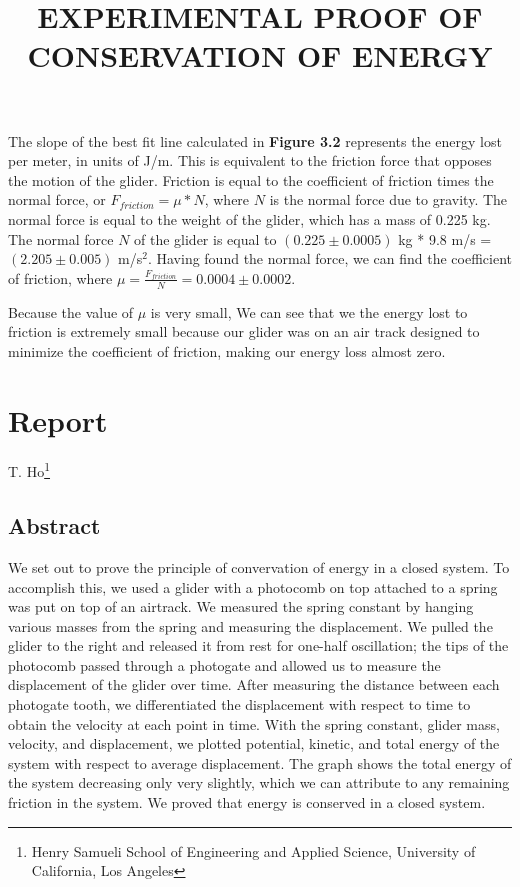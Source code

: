 \documentclass[11pt]{report}
\begin{document}
\newpage
\setlength{\parindent}{5ex}
The slope of the best fit line calculated in \textbf{Figure 3.2} represents the
energy lost per meter, in units of J/m.  This is equivalent to the friction
force that opposes the motion of the glider. Friction is equal to the
coefficient of friction times the normal force, or \(F_{friction} = \mu
* N\), where \(N\) is the normal force due to gravity.  The normal force is
equal to the weight of the glider, which has a mass of 0.225 kg.  The normal
force \(N\) of the glider is equal to \((0.225 \pm 0.0005)\) kg * 9.8 m/s = \((2.205
\pm 0.005)\) m/s$^2$.  Having found the normal force, we can find the coefficient
of friction, where \(\mu = \frac{F_{friction}}{N} = 0.0004 \pm 0.0002\).


Because the value of $\mu$ is very small, We can see that we the energy lost 
to friction is extremely small because our glider was on an air track designed 
to minimize the coefficient of friction, making our energy loss almost zero.  


\section*{Report}

\begin{center}
\title{
    \Large \textbf{\uppercase{Experimental Proof of Conservation of Energy}}
}

T. Ho\footnote{Henry Samueli School of Engineering and Applied Science,
University of California, Los Angeles}
\end{center}

\subsection*{Abstract}
We set out to prove the principle of convervation of energy in a closed system.
To accomplish this, we used a glider with a photocomb on top attached to a 
spring was put on top of an airtrack.  We measured the spring constant by
hanging various masses from the spring and measuring the displacement.
We pulled the glider to the right and released it from rest for one-half 
oscillation; the tips of the photocomb passed through a photogate and allowed 
us to measure the displacement of the glider over time.  After measuring the 
distance between each photogate tooth, we differentiated the displacement with 
respect to time to obtain the velocity at each point in time.   With the spring
constant, glider mass, velocity, and displacement, we plotted potential,
kinetic, and total energy of the system with respect to average displacement.
The graph shows the total energy of the system decreasing only very slightly, 
which we can attribute to any remaining friction in the system.  We proved that 
energy is conserved in a closed system.
\end{document}
